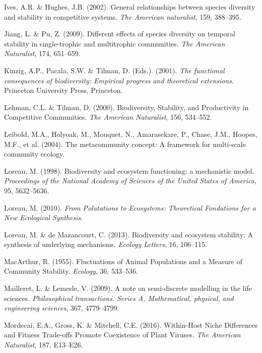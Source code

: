 \documentclass[12pt,]{article}
\begin{document}
\hypertarget{ref-Ives2002b}{}
Ives, A.R. \& Hughes, J.B. (2002). General relationships between species
diversity and stability in competitive systems. \emph{The American
naturalist}, 159, 388--395.

\hypertarget{ref-Jiang2009}{}
Jiang, L. \& Pu, Z. (2009). Different effects of species diversity on
temporal stability in single-trophic and multitrophic communities.
\emph{The American Naturalist}, 174, 651--659.

\hypertarget{ref-Kinzig2001}{}
Kinzig, A.P., Pacala, S.W. \& Tilman, D. (Eds.). (2001). \emph{The
functional consequences of biodiversity: Empirical progress and
theoretical extensions}. Princeton University Press, Princeton.

\hypertarget{ref-Lehman2000}{}
Lehman, C.L. \& Tilman, D. (2000). Biodiversity, Stability, and
Productivity in Competitive Communities. \emph{The American Naturalist},
156, 534--552.

\hypertarget{ref-Leibold2004}{}
Leibold, M.A., Holyoak, M., Mouquet, N., Amarasekare, P., Chase, J.M.,
Hoopes, M.F., et al. (2004). The metacommunity concept: A framework for
multi-scale community ecology.

\hypertarget{ref-Loreau1998}{}
Loreau, M. (1998). Biodiversity and ecosystem functioning: a mechanistic
model. \emph{Proceedings of the National Academy of Sciences of the
United States of America}, 95, 5632--5636.

\hypertarget{ref-Loreau2010}{}
Loreau, M. (2010). \emph{From Polutations to Ecosystems: Theoretical
Fondations for a New Ecological Synthesis}.

\hypertarget{ref-Loreau2013}{}
Loreau, M. \& de Mazancourt, C. (2013). Biodiversity and ecosystem
stability: A synthesis of underlying mechanisms. \emph{Ecology Letters},
16, 106--115.

\hypertarget{ref-MacArthur1955}{}
MacArthur, R. (1955). Fluctuations of Animal Populations and a Measure
of Community Stability. \emph{Ecology}, 36, 533--536.

\hypertarget{ref-Mailleret2009}{}
Mailleret, L. \& Lemesle, V. (2009). A note on semi-discrete modelling
in the life sciences. \emph{Philosophical transactions. Series A,
Mathematical, physical, and engineering sciences}, 367, 4779--4799.

\hypertarget{ref-Mordecai2016}{}
Mordecai, E.A., Gross, K. \& Mitchell, C.E. (2016). Within-Host Niche
Differences and Fitness Trade-offs Promote Coexistence of Plant Viruses.
\emph{The American Naturalist}, 187, E13--E26.
\end{document}
